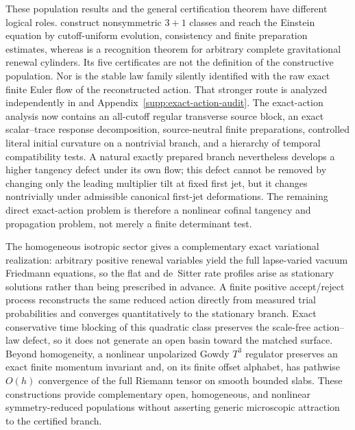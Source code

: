 \documentclass[11pt]{article}
\theoremstyle{definition}
\theoremstyle{remark}
\begin{document}
These population results and the general certification theorem have different
logical roles.   construct
nonsymmetric $3+1$ classes and reach the Einstein equation by cutoff-uniform
evolution, consistency and finite preparation estimates, whereas
 is a recognition theorem for arbitrary
complete gravitational renewal cylinders.  Its five certificates are not the
definition of the constructive population.  Nor is the stable law family
silently identified with the raw exact finite Euler flow of the reconstructed
action.  That stronger route is analyzed independently in
 and
Appendix~\ref{supp:exact-action-audit}.  The exact-action analysis now contains
an all-cutoff regular transverse source block, an exact scalar--trace response
decomposition, source-neutral finite preparations, controlled literal initial
curvature on a nontrivial branch, and a hierarchy of temporal compatibility
tests.  A natural exactly prepared branch nevertheless develops a higher
tangency defect under its own flow; this defect cannot be removed by changing
only the leading multiplier tilt at fixed first jet, but it changes
nontrivially under admissible canonical first-jet deformations.  The remaining
direct exact-action problem is therefore a nonlinear cofinal tangency and
propagation problem, not merely a finite determinant test.

The homogeneous isotropic sector gives a complementary exact variational
realization: arbitrary positive renewal variables yield the full lapse-varied
vacuum Friedmann equations, so the flat and de~Sitter rate profiles arise as
stationary solutions rather than being prescribed in advance.  A finite
positive accept/reject process reconstructs the same reduced action directly
from measured trial probabilities and converges quantitatively to the
stationary branch.  Exact conservative time blocking of this quadratic class
preserves the scale-free action--law defect, so it does not generate an open
basin toward the matched surface.  Beyond homogeneity, a nonlinear unpolarized
Gowdy $T^3$ regulator preserves an exact finite momentum invariant and, on its
finite offset alphabet, has pathwise $O(h)$ convergence of the full Riemann
tensor on smooth bounded slabs.  These constructions provide complementary
open, homogeneous, and nonlinear symmetry-reduced populations without
asserting generic microscopic attraction to the certified branch.
\end{document}
